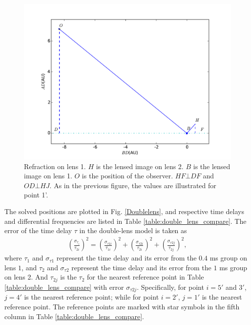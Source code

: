 \documentclass[useAMS,usenatbib]{mn2e}
\begin{document}
\begin{figure}
\centering
\includegraphics[width=1.0\linewidth]{Second_reflection.pdf}
\caption{Refraction on lens 1. 
$H$ is the lensed image on lens 2. $B$ is the lensed image on lens 1. $O$ is the position of the observer. $HF\bot DF$ and $OD\bot HJ$. As in the previous figure, the values are illustrated for point 1'. }
\label{second_reflect}
\end{figure}



The solved positions are plotted in Fig. \ref{Doublelens}, and
respective time delays and differential frequencies are listed in
Table \ref{table:double_lens_compare}. The error of the time delay $\tau$
in the double-lens model is taken as
\begin{equation}
\begin{aligned}
(\frac{\sigma_{\tau_i}}{\tau_{2i}})^2 = (\frac{\sigma_{\tau1i}}{\tau_{1i}})^2+(\frac{\sigma_{\tau2i}}{\tau_{2i}})^2 + (\frac{\sigma_{\tau2j}}{\tau_{2j}})^2,
\end{aligned}
\end{equation}
where $\tau_1$ and $\sigma_{\tau1}$ represent the time delay and its
error from the $0.4$ ms group on lens $1$, and $\tau_2$ and
$\sigma_{\tau2}$ represent the time delay and its error from
the $1$ ms group on lens 2. And $\tau_{2j}$ is the $\tau_2$ for
the nearest reference point in Table
\ref{table:double_lens_compare} with error $\sigma_{\tau2j}$.  
Specifically,
for point $i=5'$ and $3'$, $j=4'$ is the nearest reference point; while for point $i=2'$, $j=1'$ is the nearest reference point. The reference points are marked with star symbols in the fifth column in Table \ref{table:double_lens_compare}.
\end{document}
